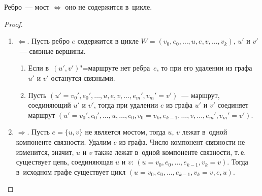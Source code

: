 \begin{statement}
\label{st:criterion_of_bridge_in_graph}
Ребро~--- мост $\Leftrightarrow$ оно не содержится в~цикле.
\end{statement}
\begin{proof}
\begin{enumerate}
	\item $\Leftarrow$.
	Пусть ребро $e$ содержится в цикле $W = (v_0, e_0, \ldots, u, e, v, \ldots, v_k)$, $u'$ и $v'$~--- связные вершины.
	\begin{enumerate}
		\item Если в~$(u', v')$"=маршруте нет ребра~$e$, то при его удалении из графа $u'$ и $v'$ останутся связными.
		\item Пусть $(u' = v_0', e_0', \ldots, u, e, v, \ldots, e_m', v_m' = v')$~--- маршрут, соединяющий $u'$ и $v'$, тогда при удалении $e$ из графа $u'$ и $v'$ соединяет маршрут
		$(u' = v_0', e_0', \ldots, u, \ldots, e_0, v_0 = v_k, e_{k-1}, \ldots, v, \ldots, e_m', v_m' = v')$.
	\end{enumerate}
	
	\item $\Rightarrow$.
	Пусть $e = \{ u, v \}$ не является мостом, тогда $u$, $v$ лежат в~одной компоненте связности.
	Удалим $e$ из графа.
	Число компонент связности не изменится, значит, $u$ и $v$ также лежат в~одной компоненте связности, т.\,е. существует цепь, соединяющая $u$ и $v$: $(u = v_0, e_0, \ldots, e_{k-1}, v_k = v)$.
	Тогда в~исходном графе существует цикл $(u = v_0, e_0, \ldots, e_{k-1}, v_k = v, e, u)$.
\end{enumerate}
\end{proof}

